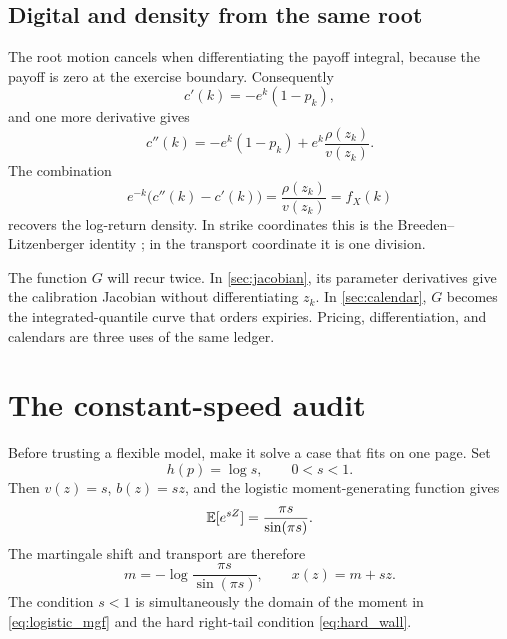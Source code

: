 \documentclass[11pt]{article}
\begin{document}
\subsection{Digital and density from the same root}

The root motion cancels when differentiating the payoff integral, because the
payoff is zero at the exercise boundary.  Consequently
\begin{equation}
c'(k)=-e^k(1-p_k),
\label{eq:call_first_k}
\end{equation}
and one more derivative gives
\begin{equation}
c''(k)
=-e^k(1-p_k)+
e^k\frac{\rho(z_k)}{v(z_k)}.
\label{eq:call_second_k}
\end{equation}
The combination
\begin{equation}
e^{-k}\bigl(c''(k)-c'(k)\bigr)
=\frac{\rho(z_k)}{v(z_k)}
=f_X(k)
\label{eq:density_from_k}
\end{equation}
recovers the log-return density.  In strike coordinates this is the
Breeden--Litzenberger identity \cite{breedenlitzenberger}; in the transport
coordinate it is one division.

\begin{heuristic}
The function $G$ will recur twice.  In \cref{sec:jacobian}, its parameter
derivatives give the calibration Jacobian without differentiating $z_k$.  In
\cref{sec:calendar}, $G$ becomes the integrated-quantile curve that orders
expiries.  Pricing, differentiation, and calendars are three uses of the same
ledger.
\end{heuristic}


\section{The constant-speed audit}
\label{sec:constant}

Before trusting a flexible model, make it solve a case that fits on one page.
Set
\begin{equation}
h(p)=\log s,\qquad 0<s<1.
\label{eq:constant_speed}
\end{equation}
Then $v(z)=s$, $b(z)=sz$, and the logistic moment-generating function gives
\begin{equation}
\mathbb{E}[e^{sZ}]=\frac{\pi s}{\sin(\pi s)}.
\label{eq:logistic_mgf}
\end{equation}
The martingale shift and transport are therefore
\begin{equation}
m=-\log\frac{\pi s}{\sin(\pi s)},\qquad x(z)=m+sz.
\label{eq:constant_transport}
\end{equation}
The condition $s<1$ is simultaneously the domain of the moment in
\eqref{eq:logistic_mgf} and the hard right-tail condition
\eqref{eq:hard_wall}.
\end{document}
